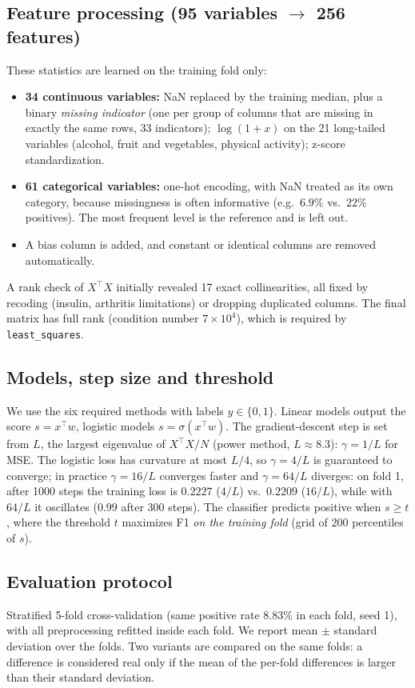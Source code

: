 \documentclass[10pt,conference,compsocconf]{IEEEtran}
\begin{document}
\subsection{Feature processing (95 variables $\rightarrow$ 256 features)}
These statistics are learned on the training fold only:
\begin{itemize}
\item \textbf{34 continuous variables:} NaN replaced by the training median, plus a binary \emph{missing indicator} (one per group of columns that are missing in exactly the same rows, 33 indicators); $\log(1+x)$ on the 21 long-tailed variables (alcohol, fruit and vegetables, physical activity); z-score standardization.
\item \textbf{61 categorical variables:} one-hot encoding, with NaN treated as its own category, because missingness is often informative (e.g.\ $6.9\%$ vs.\ $22\%$ positives). The most frequent level is the reference and is left out.
\item A bias column is added, and constant or identical columns are removed automatically.
\end{itemize}
A rank check of $X^\top X$ initially revealed 17 exact collinearities, all fixed by recoding (insulin, arthritis limitations) or dropping duplicated columns. The final matrix has full rank (condition number $7\times10^4$), which is required by \texttt{least\_squares}.

\subsection{Models, step size and threshold}
We use the six required methods with labels $y\in\{0,1\}$. Linear models output the score $s=x^\top w$, logistic models $s=\sigma(x^\top w)$. The gradient-descent step is set from $L$, the largest eigenvalue of $X^\top X/N$ (power method, $L\approx 8.3$): $\gamma=1/L$ for MSE. The logistic loss has curvature at most $L/4$, so $\gamma=4/L$ is guaranteed to converge; in practice $\gamma=16/L$ converges faster and $\gamma=64/L$ diverges: on fold 1, after 1000 steps the training loss is $0.2227$ ($4/L$) vs.\ $0.2209$ ($16/L$), while with $64/L$ it oscillates ($0.99$ after 300 steps). The classifier predicts positive when $s\ge t$, where the threshold $t$ maximizes F1 \emph{on the training fold} (grid of 200 percentiles of $s$).

\subsection{Evaluation protocol}
Stratified 5-fold cross-validation (same positive rate $8.83\%$ in each fold, seed 1), with all preprocessing refitted inside each fold. We report mean $\pm$ standard deviation over the folds. Two variants are compared on the same folds: a difference is considered real only if the mean of the per-fold differences is larger than their standard deviation.
\end{document}
